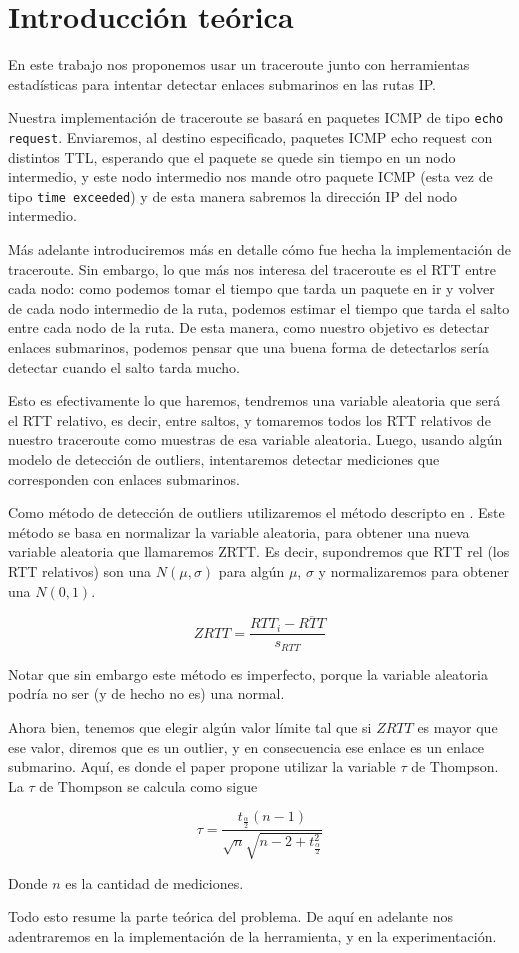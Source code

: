 \section{Introducci\'on te\'orica}

En este trabajo nos proponemos usar un traceroute junto con herramientas estadísticas para intentar detectar enlaces submarinos en las rutas IP. 

Nuestra implementación de traceroute se basará en paquetes ICMP de tipo \texttt{echo request}. Enviaremos, al destino especificado, paquetes ICMP echo request con distintos TTL, esperando que el paquete se quede sin tiempo en un nodo intermedio, y este nodo intermedio nos mande otro paquete ICMP (esta vez de tipo \texttt{time exceeded}) y de esta manera sabremos la dirección IP del nodo intermedio.


Más adelante introduciremos más en detalle cómo fue hecha la implementación de traceroute. Sin embargo, lo que más nos interesa del traceroute es el RTT entre cada nodo: como podemos tomar el tiempo que tarda un paquete en ir y volver de cada nodo intermedio de la ruta, podemos estimar el tiempo que tarda el salto entre cada nodo de la ruta. De esta manera, como nuestro objetivo es detectar enlaces submarinos, podemos pensar que una buena forma de detectarlos sería detectar cuando el salto tarda mucho.

Esto es efectivamente lo que haremos, tendremos una variable aleatoria que será el RTT relativo, es decir, entre saltos, y tomaremos todos los RTT relativos de nuestro traceroute como muestras de esa variable aleatoria. Luego, usando algún modelo de detección de outliers, intentaremos detectar mediciones que corresponden con enlaces submarinos.

Como método de detección de outliers utilizaremos el método descripto en \cite{outliers}. Este método se basa en normalizar la variable aleatoria, para obtener una nueva variable aleatoria que llamaremos ZRTT. Es decir, supondremos que RTT rel (los RTT relativos) son una $N(\mu, \sigma)$ para algún $\mu$, $\sigma$ y normalizaremos para obtener una $N(0,1)$.

\[
  ZRTT = \frac{RTT_i - \overline{RTT}}{s_{RTT}}
\]

Notar que sin embargo este método es imperfecto, porque la variable aleatoria podría no ser (y de hecho no es) una normal.

Ahora bien, tenemos que elegir algún valor límite tal que si $ZRTT$ es mayor que ese valor, diremos que es un outlier, y en consecuencia ese enlace es un enlace submarino. Aquí, es donde el paper \cite{outliers} propone utilizar la variable $\tau$ de Thompson. La $\tau$ de Thompson se calcula como sigue

\[
  \tau = \frac{
                 t_{\frac{\alpha}{2}} (n-1)
              }{
                 \sqrt{n} \sqrt{n-2 + t_{\frac{\alpha}{2}}^2}
              }
\]

Donde $n$ es la cantidad de mediciones. 

Todo esto resume la parte teórica del problema. De aquí en adelante nos adentraremos en la implementación de la herramienta, y en la experimentación.




